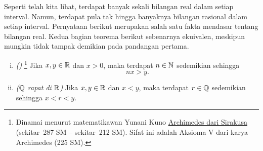 Seperti telah kita lihat, terdapat banyak sekali bilangan real dalam setiap interval.  Namun,
terdapat pula tak hingga banyaknya bilangan rasional dalam setiap interval.  Pernyataan
berikut merupakan salah satu fakta mendasar tentang bilangan real.
Kedua bagian teorema berikut sebenarnya ekuivalen, meskipun mungkin
tidak tampak demikian pada pandangan pertama.


\begin{thm} \label{thm:arch}
\pagebreak[3]
\leavevmode
\begin{enumerate}[(i)]
\item \label{thm:arch:i} \emph{()}%
\footnote{Dinamai menurut matematikawan Yunani Kuno
\href{https://en.wikipedia.org/wiki/Archimedes}{Archimedes dari Sirakusa}
(sekitar\ 287 SM -- sekitar\ 212 SM)\@.
Sifat ini adalah Aksioma V dari karya Archimedes  (225 SM)\@.}
Jika $x, y \in {\mathbb{R}}$ dan
$x > 0$, maka terdapat $n \in {\mathbb{N}}$ sedemikian sehingga
\begin{equation*}
nx > y .
\end{equation*}
\item \label{thm:arch:ii} \emph{(${\mathbb{Q}}$ rapat di ${\mathbb{R}}$)} Jika $x, y \in {\mathbb{R}}$ dan
$x < y$, maka terdapat $r \in {\mathbb{Q}}$ sedemikian sehingga
$x < r < y$.
\end{enumerate}
\end{thm}

